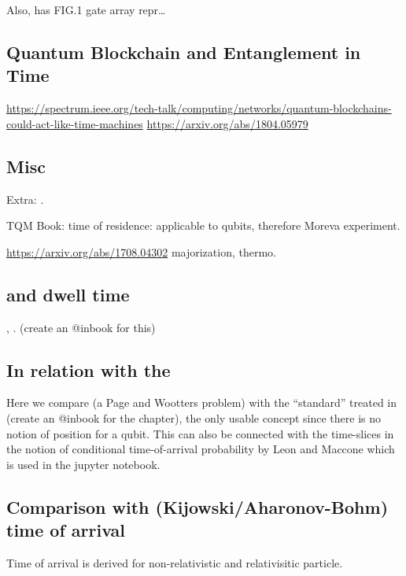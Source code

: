 Also, \cite{Moreva:illustration} has FIG.1 gate array repr\dots

\subsection{Quantum Blockchain and Entanglement in Time}

\url{https://spectrum.ieee.org/tech-talk/computing/networks/quantum-blockchains-could-act-like-time-machines}
\url{https://arxiv.org/abs/1804.05979}


\subsection{Misc}

Extra: \cite{TimeAnyons}.

TQM Book: time of residence: applicable to qubits, therefore Moreva experiment.

\url{https://arxiv.org/abs/1708.04302} majorization, thermo.


\subsection{and dwell time}

\cite[]{TQM2}, \cite{YearsleyHalliwell_Clocks}. (create an @inbook for this)

\subsection{In relation with the }

Here we compare \cite{Moreva:synthetic, Moreva:illustration}
(a Page and Wootters problem)
with the ``standard'' 
treated in \cite[.2]{TQM2} (create an @inbook for the chapter), 
the only usable concept since there is no notion of position
for a qubit. This can also be connected with the time-slices
in the notion of conditional time-of-arrival probability  by Leon and Maccone
which is used in the jupyter notebook.

\subsection[Comparison with Kijowski/Aharonov-Bohm]{Comparison with (Kijowski/Aharonov-Bohm) time of arrival}

Time of arrival is derived for non-relativistic \parencite{Delgado_TOA, Delgado_TOA2}
and relativisitic \parencite{Leon_TOA_R}
particle.

